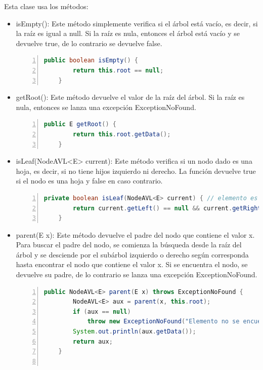 \documentclass{article}
\begin{document}
                Esta clase usa los métodos:
                \begin{itemize}
                    \item isEmpty(): Este método simplemente verifica si el árbol está vacío, es decir, si la raíz es igual a null. Si la raíz es nula, entonces el árbol está vacío y se devuelve true, de lo contrario se devuelve false.
                            \begin{lstlisting}[language=Java, caption=Método isEmpty(), numbers=left]
    public boolean isEmpty() {
        return this.root == null;
    }
                            \end{lstlisting}
                    \item getRoot(): Este método devuelve el valor de la raíz del árbol. Si la raíz es nula, entonces se lanza una excepción ExceptionNoFound.
                            \begin{lstlisting}[language=Java, caption=Método getRoot(), numbers=left]
    public E getRoot() {
        return this.root.getData();
    }
                            \end{lstlisting}
                    \item isLeaf(NodeAVL<E> current): Este método verifica si un nodo dado es una hoja, es decir, si no tiene hijos izquierdo ni derecho. La función devuelve true si el nodo es una hoja y false en caso contrario.
                            \begin{lstlisting}[language=Java, caption=Método isLeaf(NodeAVL<E> current), numbers=left]
    private boolean isLeaf(NodeAVL<E> current) { // elemento es hoja
        return current.getLeft() == null && current.getRight() == null;
    }
                            \end{lstlisting}
                    \item parent(E x): Este método devuelve el padre del nodo que contiene el valor x. Para buscar el padre del nodo, se comienza la búsqueda desde la raíz del árbol y se desciende por el subárbol izquierdo o derecho según corresponda hasta encontrar el nodo que contiene el valor x. Si se encuentra el nodo, se devuelve su padre, de lo contrario se lanza una excepción ExceptionNoFound.
                            \begin{lstlisting}[language=Java, caption=Método parent(E x), numbers=left]
    public NodeAVL<E> parent(E x) throws ExceptionNoFound {
        NodeAVL<E> aux = parent(x, this.root);
        if (aux == null)
            throw new ExceptionNoFound("Elemento no se encuentra en el arbol");
        System.out.println(aux.getData());
        return aux;
    }
    

\end{lstlisting}
\end{itemize}
\end{document}

